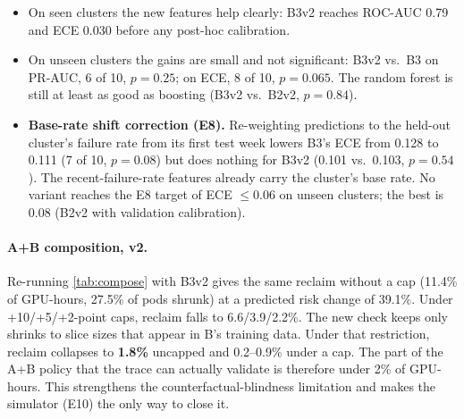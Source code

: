 \begin{itemize}
  \item On seen clusters the new features help clearly: B3v2 reaches ROC-AUC 0.79 and ECE 0.030 before any post-hoc calibration.
  \item On unseen clusters the gains are small and not significant: B3v2 vs.\ B3 on PR-AUC, 6 of 10, $p = 0.25$; on ECE, 8 of 10, $p = 0.065$. The random forest is still at least as good as boosting (B3v2 vs.\ B2v2, $p = 0.84$).
  \item \textbf{Base-rate shift correction (E8).} Re-weighting predictions to the held-out cluster's failure rate from its first test week lowers B3's ECE from 0.128 to 0.111 (7 of 10, $p = 0.08$) but does nothing for B3v2 (0.101 vs.\ 0.103, $p = 0.54$). The recent-failure-rate features already carry the cluster's base rate. No variant reaches the E8 target of ECE $\le 0.06$ on unseen clusters; the best is 0.08 (B2v2 with validation calibration).
\end{itemize}

\paragraph{A+B composition, v2.} Re-running \cref{tab:compose} with B3v2 gives the same reclaim without a cap (11.4\% of GPU-hours, 27.5\% of pods shrunk) at a predicted risk change of 39.1\%. Under +10/+5/+2-point caps, reclaim falls to 6.6/3.9/2.2\%. The new check keeps only shrinks to slice sizes that appear in B's training data. Under that restriction, reclaim collapses to \textbf{1.8\%} uncapped and 0.2--0.9\% under a cap. The part of the A+B policy that the trace can actually validate is therefore under 2\% of GPU-hours. This strengthens the counterfactual-blindness limitation and makes the simulator (E10) the only way to close it.
